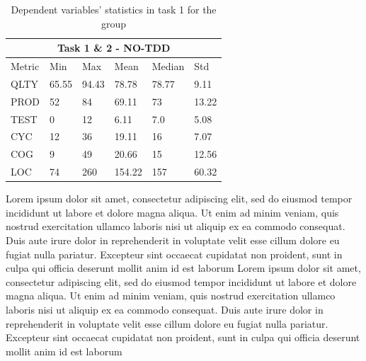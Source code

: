 \begin{table}[!h]
    \begin{center} 
        \begin{tabular}{ |p{2cm}||p{1.6cm}|p{1.6cm}|p{1.6cm}|p{1.6cm}|p{1.6cm}|}
            \hline
                \multicolumn{6}{|c|}{Task 1 \& 2 - NO-TDD} \\
            \hline
                Metric & Min & Max & Mean & Median & Std\\
            \hline
                QLTY & 65.55 & 94.43 & 78.78 & 78.77 & 9.11 \\
                PROD & 52 & 84 & 69.11 & 73 & 13.22 \\
                TEST & 0 & 12 & 6.11 & 7.0 & 5.08 \\
                CYC & 12 & 36 & 19.11 & 16 & 7.07 \\
                COG & 9 & 49 & 20.66 & 15 & 12.56 \\
                LOC & 74 & 260 & 154.22 & 157 & 60.32 \\
            \hline
        \end{tabular}
        \caption{\label{tab_dv_t1_2_notdd}Dependent variables' statistics in task 1 for the \notdd group}
    \end{center}
\end{table}

Lorem ipsum dolor sit amet, consectetur adipiscing elit, sed do eiusmod tempor incididunt ut labore et dolore magna aliqua. Ut enim ad minim veniam, quis nostrud exercitation ullamco laboris nisi ut aliquip ex ea commodo consequat. Duis aute irure dolor in reprehenderit in voluptate velit esse cillum dolore eu fugiat nulla pariatur. Excepteur sint occaecat cupidatat non proident, sunt in culpa qui officia deserunt mollit anim id est laborum
Lorem ipsum dolor sit amet, consectetur adipiscing elit, sed do eiusmod tempor incididunt ut labore et dolore magna aliqua. Ut enim ad minim veniam, quis nostrud exercitation ullamco laboris nisi ut aliquip ex ea commodo consequat. Duis aute irure dolor in reprehenderit in voluptate velit esse cillum dolore eu fugiat nulla pariatur. Excepteur sint occaecat cupidatat non proident, sunt in culpa qui officia deserunt mollit anim id est laborum

